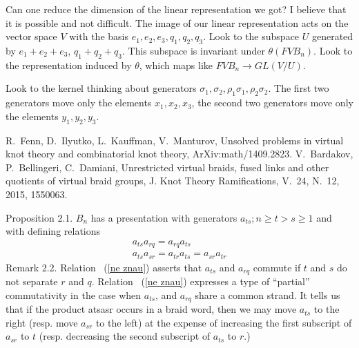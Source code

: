 \documentclass{article}
\begin{document}
Can one reduce the dimension of the linear representation we got? I believe that it is possible and not difficult. The image of our linear representation acts on the vector space $V$ with the basis $e_1,e_2,e_3,q_1,q_2,q_3$. Look to the subspace $U$ generated by $e_1+e_2+e_3$, $q_1+q_2+q_3$. This subspace is invariant under $\theta(FVB_n)$. Look to the representation induced by $\theta$, which maps like $FVB_n\to GL(V/U)$.

Look to the kernel thinking about generators $\sigma_1, \sigma_2, \rho_1\sigma_1,\rho_2\sigma_2$. The first two generators move only the elements $x_1,x_2,x_3$, the second two generators move only the elements $y_1,y_2,y_3$.

\begin{thebibliography}{00}
R.~Fenn, D.~Ilyutko, L.~Kauffman, V.~Manturov, Unsolved problems in virtual knot theory and combinatorial knot theory, ArXiv:math/1409.2823.
V.~Bardakov, P.~Bellingeri, C.~Damiani, Unrestricted virtual braids, fused links and other quotients of virtual braid groups, J. Knot Theory Ramifications, V.~24, N.~12, 2015, 1550063.
\end{thebibliography}

Proposition 2.1. $B_n$ has a presentation with generators {$a_{ts};n \geqslant t >s \geqslant 1$} and with defining relations
\begin{eqnarray}
a_{ts}a_{rq}=a_{rq}a_{ts} \\ a_{ts}a_{sr}=a_{tr}a_{ts}=a_{sr}a_{tr}
\end{eqnarray}
Remark 2.2. Relation ~(\ref{ne znau}) asserts that $a_{ts}$ and $a_{rq}$ commute if $t$ and $s$ do
not separate $r$ and $q$. Relation ~(\ref{ne znau}) expresses a type of ``partial'' commutativity in the case when $a_{ts}$, and $a_{rq}$ share a common strand. It tells us that if the product atsasr occurs in a braid word, then we may move $a_{ts}$ to the right (resp. move $a_{sr}$ to the left) at the expense of increasing the first subscript of $a_{sr}$ to $t$ (resp. decreasing the second subscript of $a_{ts}$ to $r$.)
\end{document}
